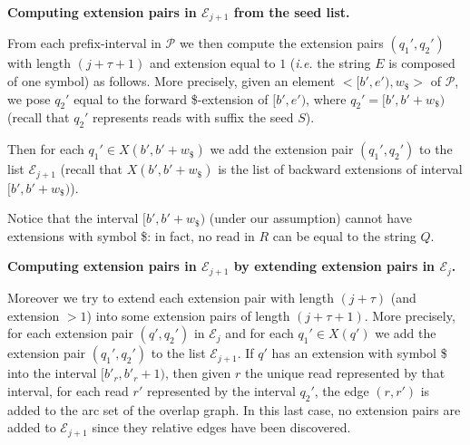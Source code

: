 \documentclass[runningheads,envcountsame,a4paper]{llncs}
\newcommand{\ie}{\textit{i.e.}\xspace}
\begin{document}

\noindent
{\bf Computing  extension pairs in $\mathcal{E}_{j+1}$ from the seed list.}


From each  prefix-interval in $\mathcal{P}$ we then compute the extension pairs $(q_{1}', q_{2}')$ with
length $(j+\tau+1)$ and extension equal to $1$ (\ie the string $E$ is composed of one symbol) as follows.
More precisely, given an element  $<[b',e'), w_\$>$ of $\mathcal{P}$,
we pose $q_{2}'$ equal to the forward \$-extension of  $[b',e')$, where   $q_{2}' = [b',b'+w_\$)$
(recall that $q_{2}'$ represents reads with suffix the seed $S$).


Then
for each $q_{1}'\in X(b',b'+w_\$)$ we add the extension pair  $(q_{1}',q_{2}')$ to
the list $\mathcal{E}_{j+1}$ (recall that $ X(b',b'+w_\$)$ is the list of backward extensions of interval $[b',b'+w_\$)$).


Notice that the interval $[b', b'+w_\$)$ (under our assumption) cannot have
extensions with symbol \$: in fact, no read in $R$ can be equal to the string $Q$.

\noindent
{\bf Computing  extension pairs in $\mathcal{E}_{j+1}$ by extending   extension pairs in $\mathcal{E}_{j}$.}

Moreover we try to extend each extension pair with length $(j+\tau)$ (and extension $>1$) into some
extension pairs of length $(j+\tau+1)$.
More precisely, for each extension pair $(q', q_{2}')$ in  $\mathcal{E}_j$ and
for each $q_{1}'\in X(q')$ we add the extension pair  $(q_{1}',q_{2}')$ to
the list $\mathcal{E}_{j+1}$.
If  $q'$ has an  extension with symbol \$
into the interval $[b'_r, b'_r+1)$, then given  $r$ the unique  read represented by that
interval, for   each read  $r'$ represented by the
interval $q_{2}'$, the edge $(r,r')$ is added to the arc set of the overlap graph.
 In this last case, no extension pairs are added to $\mathcal{E}_{j+1}$ since they relative edges have been discovered.

\end{document}
